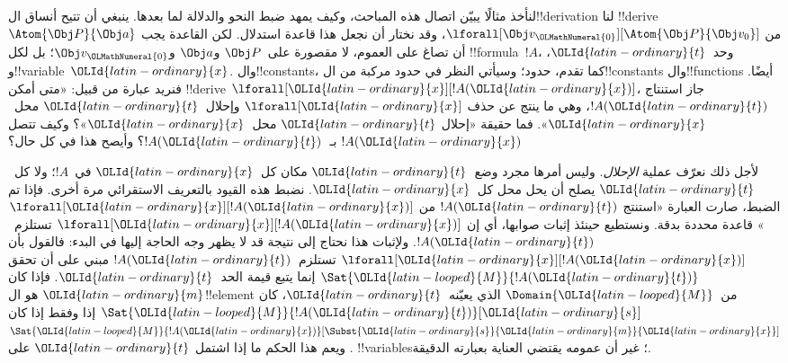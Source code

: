 \documentclass[../../../include/open-logic-section]{subfiles}
\begin{document}


لنأخذ مثالًا يبيّن اتصال هذه المباحث، وكيف يمهد ضبط النحو والدلالة
لما بعدها. ينبغي أن تتيح أنساق ال!!{derivation} لنا
!!{derive} $\Atom{\Obj P}{\Obj a}$ من
$\lforall[\Obj v_{\OLMathNumeral{0}}][\Atom{\Obj P}{\Obj v_0}]$، وقد نختار أن
نجعل هذا قاعدة استدلال. لكن القاعدة يجب أن تصاغ على العموم،
لا مقصورة على~$\Obj P$ و$\Obj a$ و$\Obj v_{\OLMathNumeral{0}}$؛ بل لكل
!!{formula}~$!A$، وحد~${\OLId{latin-ordinary}{t}}$، و!!{variable}~${\OLId{latin-ordinary}{x}}$. وال!!{constant}s،
كما تقدم، حدود؛ وسيأتي النظر في حدود مركبة من
ال!!{constant}s وال!!{function}s أيضًا. فنريد عبارة من قبيل:
«متى أمكن !!{derive} $\lforall[{\OLId{latin-ordinary}{x}}][!A({\OLId{latin-ordinary}{x}})]$، جاز استنتاج
$!A({\OLId{latin-ordinary}{t}})$، وهي ما ينتج عن حذف $\lforall[{\OLId{latin-ordinary}{x}}]$ وإحلال~${\OLId{latin-ordinary}{t}}$
محل~${\OLId{latin-ordinary}{x}}$». فما حقيقة «إحلال ${\OLId{latin-ordinary}{t}}$ محل~${\OLId{latin-ordinary}{x}}$»؟ وكيف تتصل
$!A({\OLId{latin-ordinary}{x}})$ بـ~$!A({\OLId{latin-ordinary}{t}})$؟ وأيصح هذا في كل حال؟

لأجل ذلك نعرّف عملية \emph{الإحلال}. وليس أمرها مجرد وضع~${\OLId{latin-ordinary}{t}}$
مكان كل~${\OLId{latin-ordinary}{x}}$ في~$!A$؛ ولا كل~${\OLId{latin-ordinary}{t}}$ يصلح أن يحل محل كل~${\OLId{latin-ordinary}{x}}$.
نضبط هذه القيود بالتعريف الاستقرائي مرة أخرى. فإذا تم الضبط،
صارت العبارة «استنتج $!A({\OLId{latin-ordinary}{t}})$ من $\lforall[{\OLId{latin-ordinary}{x}}][!A({\OLId{latin-ordinary}{x}})]$» قاعدة
محددة بدقة. ونستطيع حينئذ إثبات صوابها، أي إن
$\lforall[{\OLId{latin-ordinary}{x}}][!A({\OLId{latin-ordinary}{x}})]$ تستلزم~$!A({\OLId{latin-ordinary}{t}})$. ولإثبات هذا نحتاج إلى
نتيجة قد لا يظهر وجه الحاجة إليها في البدء: فالقول بأن
$\lforall[{\OLId{latin-ordinary}{x}}][!A({\OLId{latin-ordinary}{x}})]$ تستلزم~$!A({\OLId{latin-ordinary}{t}})$ مبني على أن تحقق
$\Sat{{\OLId{latin-looped}{M}}}{!A({\OLId{latin-ordinary}{t}})}$ إنما يتبع قيمة الحد~${\OLId{latin-ordinary}{t}}$. فإذا كان ${\OLId{latin-ordinary}{m}}$
هو ال!!{element} من~$\Domain{{\OLId{latin-looped}{M}}}$ الذي يعيّنه~${\OLId{latin-ordinary}{t}}$، كان
$\Sat{{\OLId{latin-looped}{M}}}{!A({\OLId{latin-ordinary}{t}})}[{\OLId{latin-ordinary}{s}}]$ إذا وفقط إذا كان
$\Sat{{\OLId{latin-looped}{M}}}{!A({\OLId{latin-ordinary}{x}})}[\Subst{{\OLId{latin-ordinary}{s}}}{{\OLId{latin-ordinary}{m}}}{{\OLId{latin-ordinary}{x}}}]$. ويعم هذا الحكم ما إذا
اشتمل ${\OLId{latin-ordinary}{t}}$ على !!{variable}s؛ غير أن عمومه يقتضي العناية
بعبارته الدقيقة.
\end{document}
